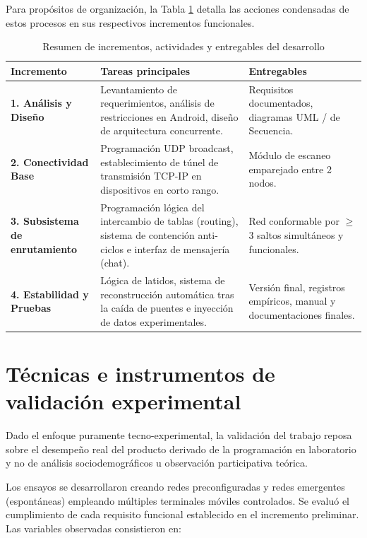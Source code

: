 \documentclass[12pt,oneside]{scrreprt}
\begin{document}
Para propósitos de organización, la Tabla \ref{tab:met-sprints} detalla las acciones condensadas de estos procesos en sus respectivos incrementos funcionales.

\begin{table}[H]
\centering
\singlespacing
\caption{Resumen de incrementos, actividades y entregables del desarrollo}
\label{tab:met-sprints}
\renewcommand{\arraystretch}{1.2}
\begin{tabularx}{\textwidth}{@{} >{\raggedright\arraybackslash\hyphenpenalty=10000\exhyphenpenalty=10000\bfseries}p{2.5cm} >{\raggedright\arraybackslash\hyphenpenalty=10000\exhyphenpenalty=10000}X >{\raggedright\arraybackslash\hyphenpenalty=10000\exhyphenpenalty=10000}p{4.5cm} @{}}
\toprule
Incremento & Tareas principales & Entregables \\
\midrule
1. Análisis y Diseño & Levantamiento de requerimientos, análisis de restricciones en Android, diseño de arquitectura concurrente. & Requisitos documentados, diagramas UML / de Secuencia. \\
2. Conectividad Base & Programación UDP broadcast, establecimiento de túnel de transmisión TCP-IP en dispositivos en corto rango. & Módulo de escaneo emparejado entre 2 nodos. \\
3. Subsistema de enrutamiento & Programación lógica del intercambio de tablas (routing), sistema de contención anti-ciclos e interfaz de mensajería (chat). & Red conformable por $\geq$ 3 saltos simultáneos y funcionales. \\
4. Estabilidad y Pruebas & Lógica de latidos, sistema de reconstrucción automática tras la caída de puentes e inyección de datos experimentales. & Versión final, registros empíricos, manual y documentaciones finales. \\
\bottomrule
\end{tabularx}
\end{table}

\section{Técnicas e instrumentos de validación experimental}

Dado el enfoque puramente tecno-experimental, la validación del trabajo reposa sobre el desempeño real del producto derivado de la programación en laboratorio y no de análisis sociodemográficos u observación participativa teórica.

Los ensayos se desarrollaron creando redes preconfiguradas y redes emergentes (espontáneas) empleando múltiples terminales móviles controlados. Se evaluó el cumplimiento de cada requisito funcional establecido en el incremento preliminar. Las variables observadas consistieron en:
\end{document}
